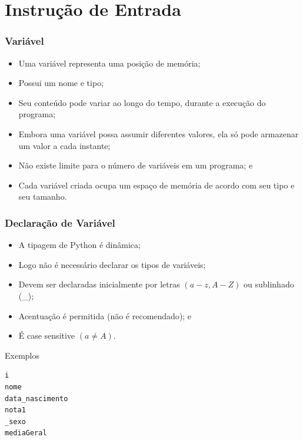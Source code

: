 \documentclass[aspectratio=169]{beamer} %
\begin{document}
\section{Instru\c cão de Entrada}

\begin{frame}
\frametitle{Variável}

\begin{itemize}
	\item Uma variável representa uma posição de memória;
	\item Possui um nome e tipo;
	\item Seu conteúdo pode variar ao longo do tempo, durante a execução do
	programa;
	\item Embora uma variável possa assumir diferentes valores, ela só pode
	armazenar um valor a cada instante;
	\item Não existe limite para o número de variáveis em um programa; e
	\item Cada variável criada ocupa um espaço de memória de acordo com seu
	tipo e seu tamanho.
\end{itemize}

\end{frame}

\begin{frame}[fragile]
\frametitle{Declaração de Variável}

\begin{itemize}
	\item A tipagem de Python é dinâmica;
	\item Logo não é necessário declarar os tipos de variáveis;
	\item Devem ser declaradas inicialmente por letras $(a - z, A - Z)$ ou sublinhado (\_);
	\item Acentuação é permitida (\alert{não é recomendado}); e
	\item É case sensitive $(a \neq A)$.
\end{itemize}\vfill

\begin{exampleblock}{Exemplos}
	\begin{lstlisting}	
i
nome
data_nascimento
nota1
_sexo
mediaGeral
	\end{lstlisting}
\end{exampleblock}
\end{frame}
\end{document}
